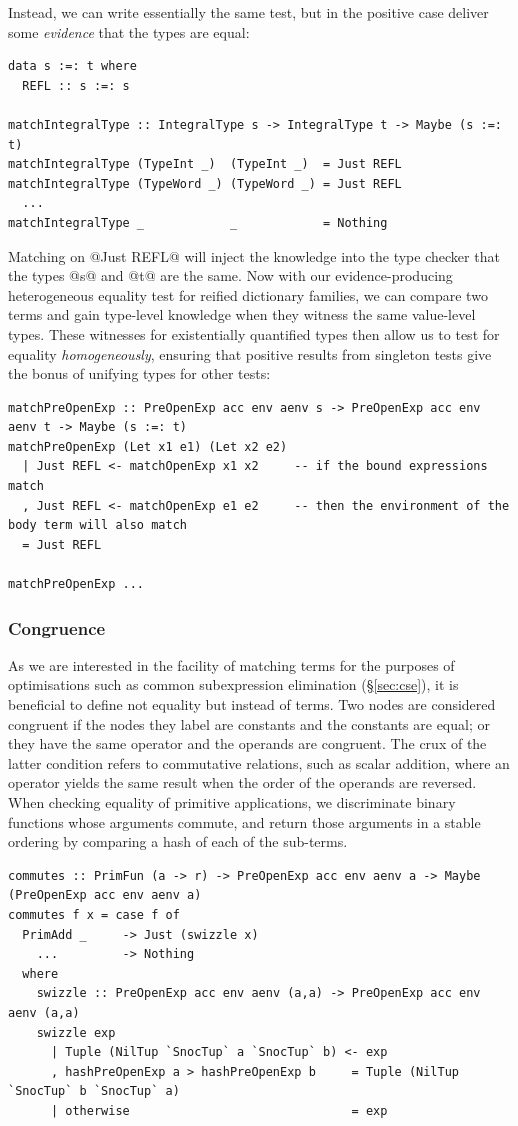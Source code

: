 Instead, we can write essentially the same test, but in the positive case
deliver some \emph{evidence} that the types are equal:
%
\begin{lstlisting}[style=haskell]
data s :=: t where
  REFL :: s :=: s

matchIntegralType :: IntegralType s -> IntegralType t -> Maybe (s :=: t)
matchIntegralType (TypeInt _)  (TypeInt _)  = Just REFL
matchIntegralType (TypeWord _) (TypeWord _) = Just REFL
  ...
matchIntegralType _            _            = Nothing
\end{lstlisting}
%
Matching on @Just REFL@ will inject the knowledge into the type
checker that the types @s@ and @t@ are the same. Now with our
evidence-producing heterogeneous equality test for reified dictionary families,
we can compare two terms and gain type-level knowledge when they witness the
same value-level types. These witnesses for existentially quantified types then
allow us to test for equality \emph{homogeneously}, ensuring that positive
results from singleton tests give the bonus of unifying types for other tests:
%
\begin{lstlisting}[style=haskell]
matchPreOpenExp :: PreOpenExp acc env aenv s -> PreOpenExp acc env aenv t -> Maybe (s :=: t)
matchPreOpenExp (Let x1 e1) (Let x2 e2)
  | Just REFL <- matchOpenExp x1 x2     -- if the bound expressions match
  , Just REFL <- matchOpenExp e1 e2     -- then the environment of the body term will also match
  = Just REFL

matchPreOpenExp ...
\end{lstlisting}


\subsubsection{Congruence}

As we are interested in the facility of matching terms for the purposes of
optimisations such as common subexpression elimination (\S\ref{sec:cse}), it is
beneficial to define not equality but instead  of terms. Two
nodes are considered congruent if the nodes they label are constants and the
constants are equal; or they have the same operator and the operands are
congruent. The crux of the latter condition refers to commutative relations,
such as scalar addition, where an operator yields the same result when the order
of the operands are reversed. When checking equality of primitive applications,
we discriminate binary functions whose arguments commute, and return those
arguments in a stable ordering by comparing a hash of each of the sub-terms.
%
\begin{lstlisting}[style=haskell]
commutes :: PrimFun (a -> r) -> PreOpenExp acc env aenv a -> Maybe (PreOpenExp acc env aenv a)
commutes f x = case f of
  PrimAdd _     -> Just (swizzle x)
    ...         -> Nothing
  where
    swizzle :: PreOpenExp acc env aenv (a,a) -> PreOpenExp acc env aenv (a,a)
    swizzle exp
      | Tuple (NilTup `SnocTup` a `SnocTup` b) <- exp
      , hashPreOpenExp a > hashPreOpenExp b     = Tuple (NilTup `SnocTup` b `SnocTup` a)
      | otherwise                               = exp
\end{lstlisting}


